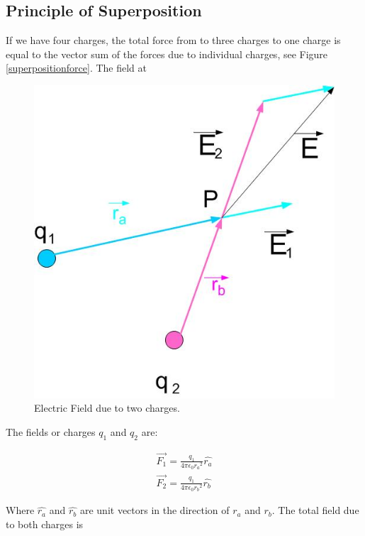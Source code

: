 \documentclass{ximera}
\begin{document}
\subsection{Principle of Superposition}

If we have four charges, the total force from to three charges to one charge is equal to the vector sum of the forces due to individual charges, see Figure \ref{superpositionforce}.  The field at



\begin{figure}[htbp]
\begin{center}
\includegraphics[scale=0.5]{../jpg/superposition.jpg}
\end{center}
\caption{Electric Field due to two charges.}
\label{UnitCh}
\end{figure}

The fields or charges $q_1$ and $q_2$ are:

\begin{eqnarray}
\vec{F_1}=\frac{q_1}{4 \pi \epsilon_{0} {r_a}^2} \hat{r_a} \label{field}\\
\vec{F_2}=\frac{q_1}{4 \pi \epsilon_{0} {r_b}^2} \hat{r_b}
\end{eqnarray}

Where $\hat{r_a}$ and $\hat{r_b}$ are unit vectors in the direction of $r_a$ and $r_b$. The total field due to both charges is
\end{document}
